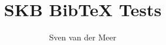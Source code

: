 \documentclass{article}
\begin{document}
    \title{SKB BibTeX Tests}
    \author{Sven van der Meer}
    \maketitle

    \nocite{*}

    
    
\end{document}
